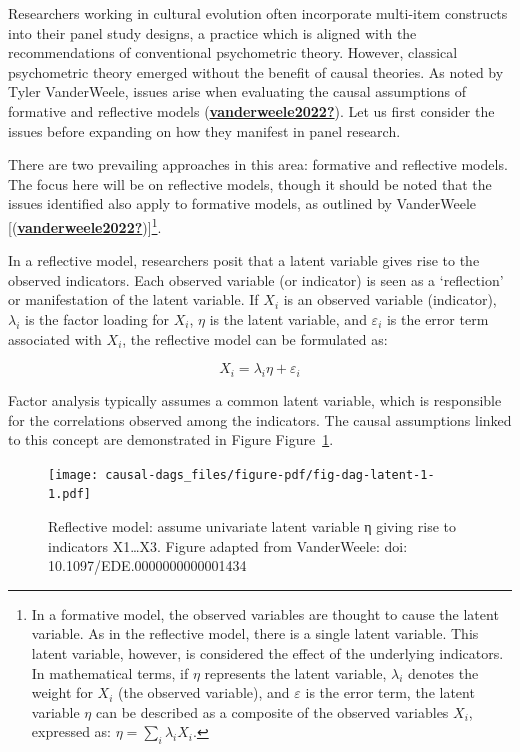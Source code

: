 \documentclass[
  singlecolumn]{report}
\begin{document}
Researchers working in cultural evolution often incorporate multi-item
constructs into their panel study designs, a practice which is aligned
with the recommendations of conventional psychometric theory. However,
classical psychometric theory emerged without the benefit of causal
theories. As noted by Tyler VanderWeele, issues arise when evaluating
the causal assumptions of formative and reflective models
(\protect\hyperlink{ref-vanderweele2022}{\textbf{vanderweele2022?}}).
Let us first consider the issues before expanding on how they manifest
in panel research.

There are two prevailing approaches in this area: formative and
reflective models. The focus here will be on reflective models, though
it should be noted that the issues identified also apply to formative
models, as outlined by VanderWeele
{[}(\protect\hyperlink{ref-vanderweele2022}{\textbf{vanderweele2022?}}){]}\footnote{In
  a formative model, the observed variables are thought to cause the
  latent variable. As in the reflective model, there is a single latent
  variable. This latent variable, however, is considered the effect of
  the underlying indicators. In mathematical terms, if \(\eta\)
  represents the latent variable, \(\lambda_i\) denotes the weight for
  \(X_i\) (the observed variable), and \(\varepsilon\) is the error
  term, the latent variable \(\eta\) can be described as a composite of
  the observed variables \(X_i\), expressed as:
  \(\eta = \sum_i\lambda_i X_i\).}.

In a reflective model, researchers posit that a latent variable gives
rise to the observed indicators. Each observed variable (or indicator)
is seen as a `reflection' or manifestation of the latent variable. If
\(X_i\) is an observed variable (indicator), \(\lambda_i\) is the factor
loading for \(X_i\), \(\eta\) is the latent variable, and
\(\varepsilon_i\) is the error term associated with \(X_i\), the
reflective model can be formulated as:

\[X_i = \lambda_i \eta + \varepsilon_i\]

Factor analysis typically assumes a common latent variable, which is
responsible for the correlations observed among the indicators. The
causal assumptions linked to this concept are demonstrated in Figure
Figure~\ref{fig-dag-latent-1}.

\begin{figure}

{\centering \texttt{[image: causal-dags\_files/figure-pdf/fig-dag-latent-1-1.pdf]}

}

\caption{\label{fig-dag-latent-1}Reflective model: assume univariate
latent variable η giving rise to indicators X1\ldots X3. Figure adapted
from VanderWeele: doi: 10.1097/EDE.0000000000001434}

\end{figure}
\end{document}
